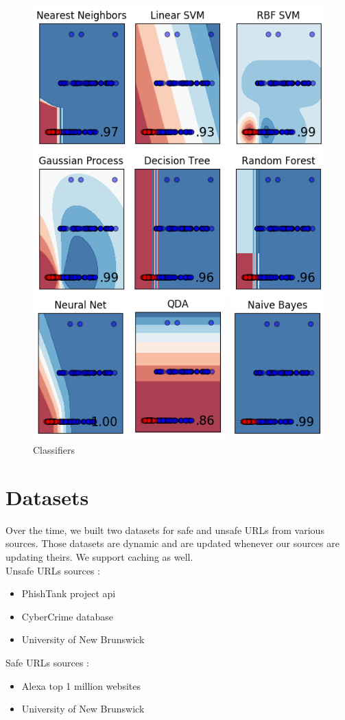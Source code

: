 \documentclass[conference,11pt]{IEEEtran}
\begin{document}
\begin{figure}[!t]
  \centering
  \includegraphics[width=\linewidth]{classifiers-list}
  \caption{Classifiers}
  \label{classifiers-list}
\end{figure}

\section{Datasets}
Over the time, we built two datasets for safe and unsafe URLs from various
sources. Those datasets are dynamic and are updated whenever our sources are
updating theirs. We support caching as well. \\

Unsafe URLs sources :
\begin{itemize}
  \item PhishTank project api \cite{phishtank}
  \item CyberCrime database \cite{cybercrime}
  \item University of New Brunswick \cite{unb-website} \cite{unb-article}
\end{itemize}
Safe URLs sources :
\begin{itemize}
  \item Alexa top 1 million websites \cite{alexa-top-1m}
  \item University of New Brunswick \cite{unb-website} \cite{unb-article}
\end{itemize}
\end{document}
